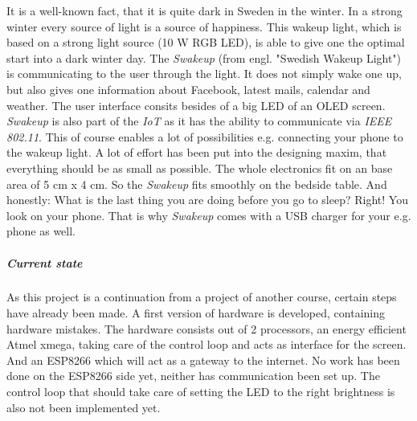 It is a well-known fact, that it is quite dark in Sweden in the winter. In a strong winter every source of light is a source of happiness. This wakeup light, which is based on a strong light source (10 W RGB LED), is able to give one the optimal start into a dark winter day. The \textit{Swakeup} (from engl. "Swedish Wakeup Light") is communicating to the user through the light. It does not simply wake one up, but also gives one information about Facebook, latest mails, calendar and weather. The user interface consits besides of a big LED of an OLED screen. \textit{Swakeup} is also part of the \textit{IoT} as it has the ability to communicate via \textit{IEEE 802.11}. This of course enables a lot of possibilities e.g. connecting your phone to the wakeup light. A lot of effort has been put into the designing maxim, that everything should be as small as possible. The whole electronics fit on an base area of 5 cm x 4 cm. So the \textit{Swakeup} fits smoothly on the bedside table. And honestly: What is the last thing you are doing before you go to sleep? Right! You look on your phone. That is why \textit{Swakeup} comes with a USB charger for your e.g. phone as well.\\
\subparagraph{Current state}
As this project is a continuation from a project of another course, certain steps have already been made. A first version of hardware is developed, containing hardware mistakes. The hardware consists out of 2 processors, an energy efficient Atmel xmega, taking care of the control loop and acts as interface for the screen. And an ESP8266 which will act as a gateway to the internet. No work has been done on the ESP8266 side yet, neither has communication been set up. The control loop that should take care of setting the LED to the right brightness is also not been implemented yet. 
